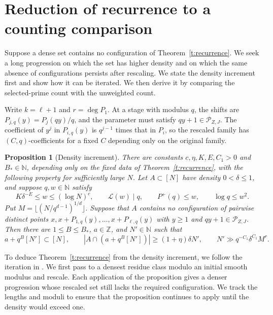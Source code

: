 \documentclass[12pt]{amsart}
\newcommand{\1}{\mathbf 1}
\newtheorem{proposition}[theorem]{Proposition}
\theoremstyle{definition}
\begin{document}
\section{Reduction of recurrence to a counting comparison}\label{s:recurrence}

Suppose a dense set contains no configuration of
Theorem~\ref{t:recurrence}. We seek a long progression on which the
set has higher density and on which the same absence of configurations
persists after rescaling. We state the density increment first and
show how it can be iterated. We then derive it by comparing the
selected-prime count with the unweighted count.

Write \(k=\ell+1\) and \(r=\deg P_1\). At a stage with modulus \(q\),
the shifts are \(P_{j,q}(y)=P_j(qy)/q\), and the parameter must satisfy
\(qy+1\in\mathcal P_{Z,J}\). The coefficient of $y^j$ in $P_{i,q}(y)$ is $q^{j-1}$
times that in $P_i$, so the rescaled family has $(C,q)$-coefficients
for a fixed $C$ depending only on the original family.

\begin{proposition}[Density increment]\label{p:selected-density-increment}
There are constants \(c,\eta,K,E,C_1>0\) and \(B_*\in\mathbb N\),
depending only on the fixed data of Theorem~\ref{t:recurrence}, with the
following property for sufficiently large \(N\). Let \(A\subset[N]\)
have density \(0<\delta\le1\), and suppose \(q,w\in\mathbb N\) satisfy
\begin{equation}\label{e:increment-hypotheses}
 K\delta^{-E}\le w\le(\log N)^c,\qquad
 \mathcal L(w)\mid q,\qquad P^+(q)\le w,\qquad \log q\le w^2.
\end{equation}
Put \(M=\lfloor(N/q^{d-1})^{1/d}\rfloor\). Suppose that \(A\) contains
no configuration of pairwise distinct points
\(x,x+P_{1,q}(y),\ldots,x+P_{\ell,q}(y)\) with
\(y\ge1\) and \(qy+1\in\mathcal P_{Z,J}\).
Then there are \(1\le B\le B_*\), \(a\in\mathbb Z\), and \(N'\in\mathbb N\)
such that
\begin{equation}\label{e:increment-output}
 a+q^B[N']\subset[N],\qquad
 |A\cap(a+q^B[N'])|\ge(1+\eta)\delta N',\qquad
 N'\gg q^{-C_1}\delta^{C_1}M^r.
\end{equation}
\end{proposition}

To deduce Theorem~\ref{t:recurrence} from the density increment, we
follow the iteration in \cite[Section~5, proof of Theorem~1.2]{KMTT}.
We first pass to a densest residue class modulo an initial smooth
modulus and rescale. Each application of the proposition gives a
denser progression whose rescaled set still lacks the required
configuration. We track the lengths and moduli to ensure that the
proposition continues to apply until the density would exceed one.
\end{document}
